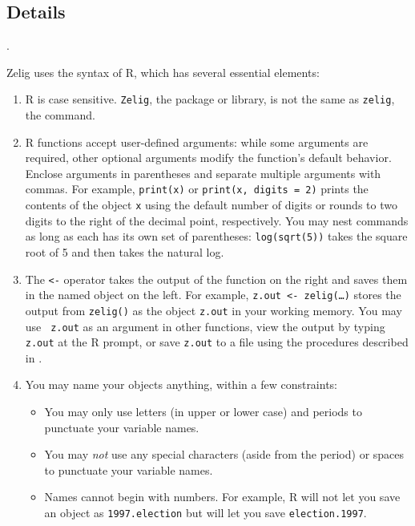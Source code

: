 \documentclass{article}
\begin{document}
\subsection{Details}\label{s:syntax}.

Zelig uses the syntax of R, which has several essential elements:
\begin{enumerate}
\item R is case sensitive.  \texttt{Zelig}, the package or library, is
  not the same as \texttt{zelig}, the command.
  
\item R functions accept user-defined arguments: while some arguments
  are required, other optional arguments modify the function's default
  behavior.  Enclose arguments in parentheses and separate multiple
  arguments with commas.  For example, {\tt print(x)} or {\tt print(x,
    digits = 2)} prints the contents of the object {\tt x} using the
  default number of digits or rounds to two digits to the right of the decimal
  point, respectively.  You may nest commands as long as each has its
  own set of parentheses: \texttt{log(sqrt(5))} takes the square root
  of 5 and then takes the natural log.
  
\item The {\tt <-} operator takes the output of the function on the
  right and saves them in the named object on the left.  For example,
  {\tt z.out <- zelig(\dots)} stores the output from {\tt zelig()} as
  the object {\tt z.out} in your working memory.  You may use {\tt
    z.out} as an argument in other functions, view the output by
  typing {\tt z.out} at the R prompt, or save {\tt z.out} to a file
  using the procedures described in .
  
\item You may name your objects anything, within a few constraints:
    \begin{itemize}
    \item You may only use letters (in upper or lower case) and
      periods to punctuate your variable names.
    \item You may \emph{not} use any special characters (aside from the
      period) or spaces to punctuate your variable names.
    \item Names cannot begin with numbers.  For example, R will not
      let you save an object as \texttt{1997.election} but will let
      you save \texttt{election.1997}.
    \end{itemize}
    

\end{enumerate}
\end{document}
